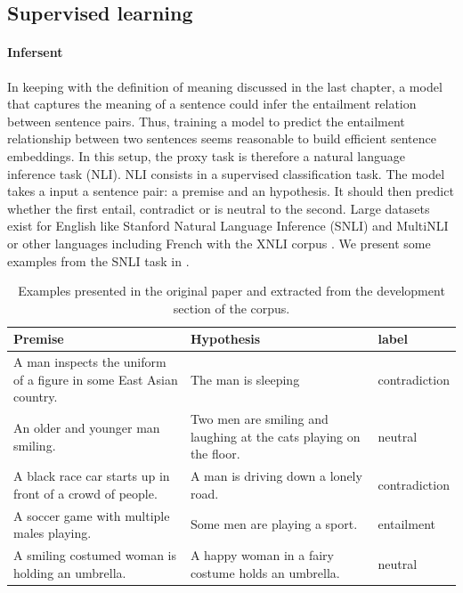 
\subsection{Supervised learning}

\paragraph{Infersent} In keeping with the definition of meaning discussed in the last chapter, a model that captures the meaning of a sentence could infer the entailment relation between sentence pairs. Thus, training a model to predict the entailment relationship between two sentences seems reasonable to build efficient sentence embeddings. In this setup, the proxy task is therefore a natural language inference task (NLI). NLI consists in a supervised classification task. The model takes a input a sentence pair: a premise and an hypothesis. It should then predict whether the first entail, contradict or is neutral to the second. Large datasets exist for English like Stanford Natural Language Inference (SNLI) \parencite{bowman_15} and MultiNLI \parencite{williams_18b} or other languages including French with the XNLI corpus \parencite{conneau_18b}. We present some examples from the SNLI task in .

\begin{table}[!htb]
\centering
\small
\begin{tabularx}{16cm}{@{}YYY@{} }
  \toprule
Premise & Hypothesis & label \\
\midrule
\midrule 
A man inspects the uniform of a figure in some East Asian country. & The man is sleeping & contradiction\\
\rule{0pt}{3ex}An older and younger man smiling. & Two men are smiling and laughing at the cats playing on the floor. & neutral\\
\rule{0pt}{3ex}A black race car starts up in front of a crowd of people. & A man is driving down a lonely road. & contradiction\\
\rule{0pt}{3ex}A soccer game with multiple males playing. & Some men are playing a sport. & entailment\\
\rule{0pt}{3ex}A smiling costumed woman is holding an umbrella. & A happy woman in a fairy costume holds an umbrella. & neutral\\
\bottomrule
\end{tabularx}
\caption{Examples presented in the original paper and extracted from the development section of the corpus.}
\end{table}



